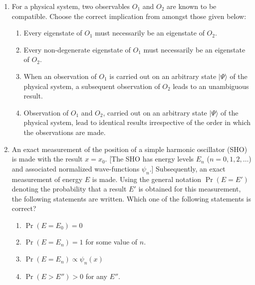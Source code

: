 \documentclass[journal,12pt,onecolumn]{IEEEtran}
\theoremstyle{remark}
\begin{document}
\begin{enumerate}
\item For a physical system, two observables $O_1$ and $O_2$ are known to be compatible. Choose the correct implication from amongst those given below:
\hfill{}
\begin{enumerate}
    \item Every eigenstate of $O_1$ must necessarily be an eigenstate of $O_2$.
    \item Every non-degenerate eigenstate of $O_1$ must necessarily be an eigenstate of $O_2$.
    \item When an observation of $O_1$ is carried out on an arbitrary state $|\Psi\rangle$ of the physical system, a subsequent observation of $O_2$ leads to an unambiguous result.
    \item Observation of $O_1$ and $O_2$, carried out on an arbitrary state $|\Psi\rangle$ of the physical system, lead to identical results irrespective of the order in which the observations are made.
\end{enumerate}
\item An exact measurement of the position of a simple harmonic oscillator (SHO) is made with the result $x = x_0$.  [The SHO has energy levels $E_n$ ($n=0,1,2,\dots$) and associated normalized wave-functions $\psi_n$.]  Subsequently, an exact measurement of energy $E$ is made.  Using the general notation $\Pr(E = E')$ denoting the probability that a result $E'$ is obtained for this measurement, the following statements are written.  Which one of the following statements is correct?
\hfill{}
\begin{multicols}{2}
\begin{enumerate}
    \item $\Pr(E = E_0) = 0$
    \item $\Pr(E = E_n) = 1$ for some value of $n$.
    \item $\Pr(E = E_n) \propto \psi_n(x)$
    \item $\Pr(E > E'') > 0$ for any $E''$.
\end{enumerate}
\end{multicols}


\end{enumerate}
\end{document}
